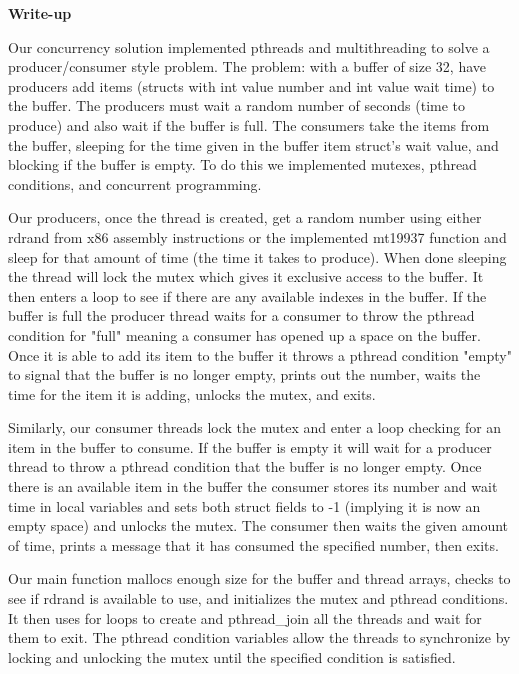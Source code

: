\documentclass[10pt,letterpaper,draftclsnofoot,onecolumn]{IEEEtran}
\begin{document}
\noindent\textbf{Write-up}
\medskip

\medskip

\noindent Our concurrency solution implemented pthreads and multithreading to solve a producer/consumer style problem. The problem: with a buffer of size 32, have producers add items (structs with int value number and int value wait time) to the buffer. The producers must wait a random number of seconds (time to produce) and also wait if the buffer is full. The consumers take the items from the buffer, sleeping for the time given in the buffer item struct's wait value, and blocking if the buffer is empty. To do this we implemented mutexes, pthread conditions, and concurrent programming.\par
\medskip

\medskip

\noindent Our producers, once the thread is created, get a random number using either rdrand from x86 assembly instructions or the implemented mt19937 function and sleep for that amount of time (the time it takes to produce). When done sleeping the thread will lock the mutex which gives it exclusive access to the buffer. It then enters a loop to see if there are any available indexes in the buffer. If the buffer is full the producer thread waits for a consumer to throw the pthread condition for "full" meaning a consumer has opened up a space on the buffer. Once it is able to add its item to the buffer it throws a pthread condition "empty" to signal that the buffer is no longer empty, prints out the number, waits the time for the item it is adding, unlocks the mutex, and exits.\par
\medskip

\medskip

\noindent Similarly, our consumer threads lock the mutex and enter a loop checking for an item in the buffer to consume. If the buffer is empty it will wait for a producer thread to throw a pthread condition that the buffer is no longer empty. Once there is an available item in the buffer the consumer stores its number and wait time in local variables and sets both struct fields to -1 (implying it is now an empty space) and unlocks the mutex. The consumer then waits the given amount of time, prints a message that it has consumed the specified number, then exits.\par
\medskip

\medskip

\noindent Our main function mallocs enough size for the buffer and thread arrays, checks to see if rdrand is available to use, and initializes the mutex and pthread conditions. It then uses for loops to create and pthread\_join all the threads and wait for them to exit. The pthread condition variables allow the threads to synchronize by locking and unlocking the mutex until the specified condition is satisfied.\par
\medskip
\end{document}
